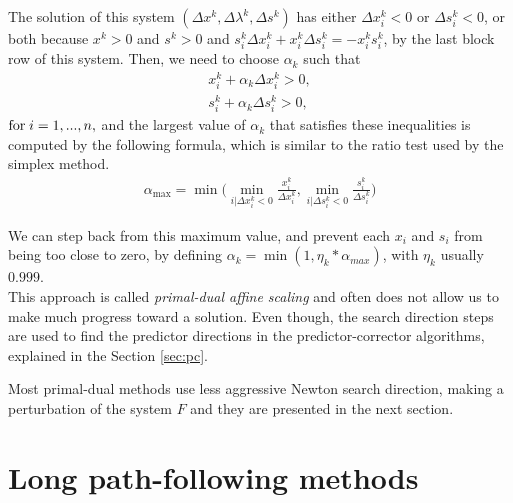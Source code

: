 \documentclass[a4paper,10 pt,titlepage,twoside]{book}
\theoremstyle{plain}
\theoremstyle{definition}
\theoremstyle{remark}
\begin{document}
The solution of this system $\left(\Delta x^{k},\Delta\lambda^{k},\Delta s^{k}\right)$ has either $\Delta x_{i}^{k}<0$ or $\Delta s_{i}^{k}<0$, or both because $x^{k}>0$ and $s^{k}>0$ and $s^{k}_{i}\Delta x^{k}_{i} + x^{k}_{i}\Delta s^{k}_{i} = - x^{k}_{i}s^{k}_{i}$, by the last block row of this system.
Then, we need to choose $\alpha_{k}$ such that
\begin{align*}
x^{k}_{i} + \alpha_{k} \Delta x^{k}_{i} >0, \\
s^{k}_{i} + \alpha_{k} \Delta s^{k}_{i} >0,	
\end{align*}
$\text{for\;} i = 1,...,n,$ and the largest value of $\alpha_{k}$ that satisfies these inequalities is computed by the following formula, which is similar to the ratio test used by the simplex method. 
\begin{align*}
\alpha_{\text{max}} = \min\bigg(\min_{i|\Delta x^{k}_{i}<0}\frac{x^{k}_{i}}{\Delta x^{k}_{i}}, \min_{i|\Delta s^{k}_{i}<0}\frac{s^{k}_{i}}{\Delta s^{k}_{i}}\bigg)
\end{align*} 

We can step back from this maximum value, and prevent each $x_{i}$ and $s_{i}$ from being too close to zero, by defining $\alpha_{k} = \min\left(1,\eta_{k}*\alpha_{max}\right)$, with $\eta_{k}$ usually $0.999$.\\
This approach is called \textit{primal-dual affine scaling} and often does not allow us to make much progress toward a solution. 
Even though, the search direction steps are used to find the predictor directions in the predictor-corrector algorithms, explained in the Section \ref{sec:pc}.

Most primal-dual methods use less aggressive Newton search direction, making a perturbation of the system $F$ and they are presented in the next section.

\section{Long path-following methods}
\end{document}
